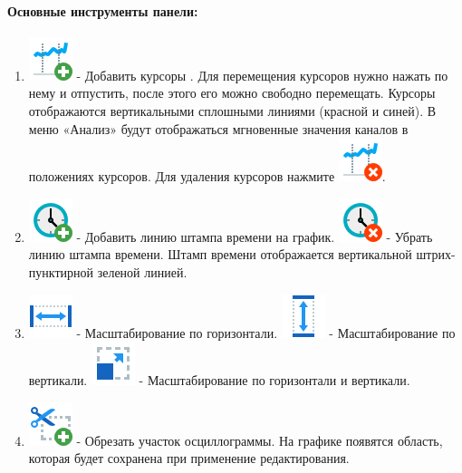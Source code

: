 \documentclass[a4paper,12pt]{article}
\begin{document}
\paragraph*{\hspace{.5cm} Основные инструменты панели:} 
\begin{enumerate} 
\item \includegraphics[width=4ex]{image/Stocks_Add.png} - Добавить курсоры . Для перемещения курсоров нужно нажать по нему и отпустить, после этого его можно свободно перемещать. Курсоры отображаются вертикальными сплошными линиями (красной и синей). В меню «Анализ» будут отображаться мгновенные значения каналов в положениях курсоров. Для удаления курсоров нажмите \includegraphics[width=4ex]{image/Stocks_Rem.png}. 
\item \includegraphics[width=4ex]{image/Watch_Add.png} - Добавить линию штампа времени на график. \includegraphics[width=4ex]{image/Watch_Rem.png} - Убрать линию штампа времени. Штамп времени отображается вертикальной штрих-пунктирной зеленой линией.  
\item \includegraphics[width=4ex]{image/Width-48.png} - Масштабирование по горизонтали. 
\includegraphics[width=4ex]{image/Height-48.png} - Масштабирование по вертикали.  
\includegraphics[width=4ex]{image/Resize-48.png} - Масштабирование по горизонтали и вертикали.  
\item \includegraphics[width=4ex]{image/Cutting_Add.png} - Обрезать участок осциллограммы. На графике появятся область, которая будет сохранена при применение редактирования.  

\end{enumerate}
\end{document}
